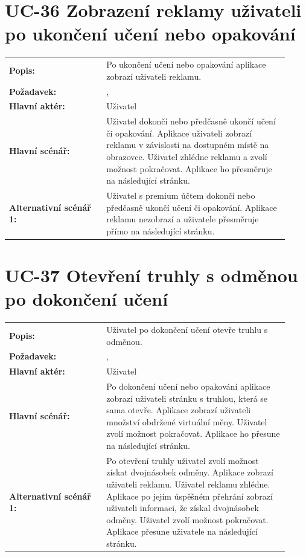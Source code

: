 \section{UC-36 Zobrazení reklamy uživateli po ukončení učení nebo opakování}\label{sec:uc-36}

\begin{tabular}{p{0.32\linewidth}p{0.6\linewidth}}
  \textbf{Popis:} & Po ukončení učení nebo opakování aplikace zobrazí uživateli reklamu. \\
  \textbf{Požadavek:} & \nameref{sec:fp-advertisement}, \nameref{sec:fp-subscription-system} \\
  \textbf{Hlavní aktér:} & Uživatel \\
  \textbf{Hlavní scénář:} & Uživatel dokončí nebo předčasně ukončí učení či opakování. Aplikace uživateli zobrazí reklamu v závislosti na dostupném místě na obrazovce. Uživatel zhlédne reklamu a zvolí možnost pokračovat. Aplikace ho přesměruje na následující stránku. \\
  \textbf{Alternativní scénář 1:} & Uživatel s premium účtem dokončí nebo předčasně ukončí učení či opakování. Aplikace reklamu nezobrazí a uživatele přesměruje přímo na následující stránku. \\
\end{tabular}

\section{UC-37 Otevření truhly s odměnou po dokončení učení}\label{sec:uc-37}

\begin{tabular}{p{0.32\linewidth}p{0.6\linewidth}}
  \textbf{Popis:} & Uživatel po dokončení učení otevře truhlu s odměnou. \\
  \textbf{Požadavek:} & \nameref{sec:fp-treasure-chest}, \nameref{sec:fp-advertisement} \\
  \textbf{Hlavní aktér:} & Uživatel \\
  \textbf{Hlavní scénář:} & Po dokončení učení nebo opakování aplikace zobrazí uživateli stránku s truhlou, která se sama otevře. Aplikace zobrazí uživateli množství obdržené virtuální měny. Uživatel zvolí možnost pokračovat. Aplikace ho přesune na následující stránku. \\
  \textbf{Alternativní scénář 1:} & Po otevření truhly uživatel zvolí možnost získat dvojnásobek odměny. Aplikace zobrazí uživateli reklamu. Uživatel reklamu zhlédne. Aplikace po jejím úspěšném přehrání zobrazí uživateli informaci, že získal dvojnásobek odměny. Uživatel zvolí možnost pokračovat. Aplikace přesune uživatele na následující stránku. \\
\end{tabular}

